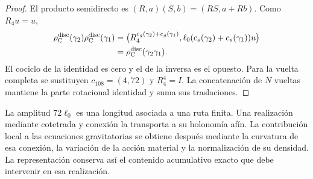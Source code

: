 \begin{proof}
El producto semidirecto es
\((R,a)(S,b)=(RS,a+Rb)\). Como \(R_4u=u\),
\[
\begin{split}
 \rho_{\rm C}^{\rm disc}(\gamma_2)
 \rho_{\rm C}^{\rm disc}(\gamma_1)
 &=
 \bigl(R_4^{c_g(\gamma_2)+c_g(\gamma_1)},
 \ell_0(c_s(\gamma_2)+c_s(\gamma_1))u\bigr)\\
 &=\rho_{\rm C}^{\rm disc}(\gamma_2\gamma_1).
\end{split}
\]
El cociclo de la identidad es cero y el de la inversa es el opuesto.
Para la vuelta completa se sustituyen \(c_{108}=(4,72)\) y
\(R_4^4=I\). La concatenación de \(N\) vueltas mantiene la parte
rotacional identidad y suma sus traslaciones.
\end{proof}

La amplitud \(72\ell_0\) es una longitud asociada a una ruta finita.
Una realización mediante cotetrada y conexión la transporta a su
holonomía afín. La contribución local a las ecuaciones gravitatorias
se obtiene después mediante la curvatura de esa conexión, la
variación de la acción material y la normalización de su densidad.
La representación conserva así el contenido acumulativo exacto que
debe intervenir en esa realización.
